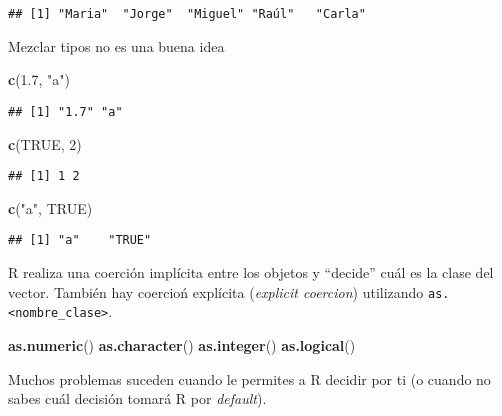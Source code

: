 \documentclass[]{article}
\newenvironment{Shaded}{\begin{snugshade}}{\end{snugshade}}
\newcommand{\KeywordTok}[1]{\textcolor[rgb]{0.13,0.29,0.53}{\textbf{{#1}}}}
\newcommand{\DecValTok}[1]{\textcolor[rgb]{0.00,0.00,0.81}{{#1}}}
\newcommand{\FloatTok}[1]{\textcolor[rgb]{0.00,0.00,0.81}{{#1}}}
\newcommand{\StringTok}[1]{\textcolor[rgb]{0.31,0.60,0.02}{{#1}}}
\newcommand{\OtherTok}[1]{\textcolor[rgb]{0.56,0.35,0.01}{{#1}}}
\newcommand{\NormalTok}[1]{{#1}}
\begin{document}
\begin{verbatim}
## [1] "Maria"  "Jorge"  "Miguel" "Raúl"   "Carla"
\end{verbatim}

Mezclar tipos no es una buena idea

\begin{Shaded}
\begin{Highlighting}[]
\KeywordTok{c}\NormalTok{(}\FloatTok{1.7}\NormalTok{, }\StringTok{"a"}\NormalTok{)}
\end{Highlighting}
\end{Shaded}

\begin{verbatim}
## [1] "1.7" "a"
\end{verbatim}

\begin{Shaded}
\begin{Highlighting}[]
\KeywordTok{c}\NormalTok{(}\OtherTok{TRUE}\NormalTok{, }\DecValTok{2}\NormalTok{)}
\end{Highlighting}
\end{Shaded}

\begin{verbatim}
## [1] 1 2
\end{verbatim}

\begin{Shaded}
\begin{Highlighting}[]
\KeywordTok{c}\NormalTok{(}\StringTok{"a"}\NormalTok{, }\OtherTok{TRUE}\NormalTok{)}
\end{Highlighting}
\end{Shaded}

\begin{verbatim}
## [1] "a"    "TRUE"
\end{verbatim}

R realiza una coerción implícita entre los objetos y ``decide'' cuál es
la clase del vector. También hay coercioń explícita (\emph{explicit
coercion}) utilizando
\texttt{as.\textless{}nombre\_clase\textgreater{}}.

\begin{Shaded}
\begin{Highlighting}[]
\KeywordTok{as.numeric}\NormalTok{()}
\KeywordTok{as.character}\NormalTok{()}
\KeywordTok{as.integer}\NormalTok{()}
\KeywordTok{as.logical}\NormalTok{()}
\end{Highlighting}
\end{Shaded}

Muchos problemas suceden cuando le permites a R decidir por ti (o cuando
no sabes cuál decisión tomará R por \emph{default}).
\end{document}
